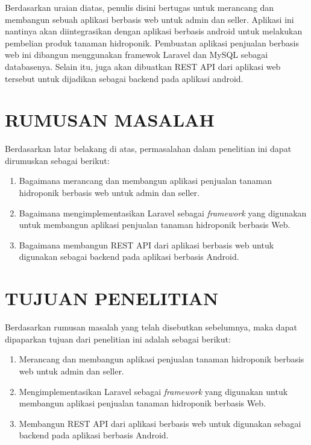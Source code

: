 \par Berdasarkan uraian diatas, penulis disini bertugas untuk merancang dan membangun sebuah aplikasi berbasis web untuk admin dan seller. Aplikasi ini nantinya akan diintegrasikan dengan aplikasi berbasis android untuk melakukan pembelian produk tanaman hidroponik. Pembuatan aplikasi penjualan berbasis web ini dibangun menggunakan framewok Laravel dan MySQL sebagai databasenya. Selain itu, juga akan dibuatkan REST API dari aplikasi web tersebut untuk dijadikan sebagai backend pada aplikasi android. 

\fancyhf{} 
\fancyfoot[R]{\thepage}

\section{\uppercase{RUMUSAN MASALAH}}
Berdasarkan latar belakang di atas, permasalahan dalam penelitian ini dapat dirumuskan sebagai berikut:
\begin{enumerate}
	\item Bagaimana merancang dan membangun aplikasi penjualan tanaman hidroponik berbasis web untuk admin dan seller.
	\item Bagaimana mengimplementasikan Laravel sebagai \textit{framework} yang digunakan untuk membangun aplikasi penjualan tanaman hidroponik berbasis Web.
	\item Bagaimana membangun REST API dari aplikasi berbasis web untuk digunakan sebagai backend  pada aplikasi berbasis Android.
\end{enumerate}

\section{\uppercase{TUJUAN PENELITIAN}}
Berdasarkan rumusan masalah yang telah disebutkan sebelumnya, maka dapat dipaparkan tujuan dari penelitian ini adalah sebagai berikut:
\begin{enumerate}
	\item Merancang dan membangun aplikasi penjualan tanaman hidroponik berbasis web untuk admin dan seller.
	\item Mengimplementasikan Laravel sebagai \textit{framework} yang digunakan untuk membangun aplikasi penjualan tanaman hidroponik berbasis Web.
	\item Membangun REST API dari aplikasi berbasis web untuk digunakan sebagai backend pada aplikasi berbasis Android.
\end{enumerate}


